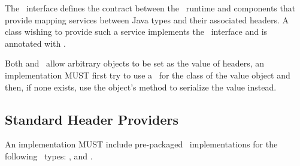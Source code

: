 The \HeaderProvider\ interface defines the contract between the \jaxrs\ runtime and components that provide mapping services between Java types and their associated headers. A class wishing to provide such a service implements the \HeaderProvider\ interface and is annotated with \Provider.

Both  and \EntityProvider\ allow arbitrary objects to be set as the value of headers, an implementation MUST first try to use a \HeaderProvider\ for the class of the value object and then, if none exists, use the object's  method to serialize the value instead.

\subsection{Standard Header Providers}
\label{standard_header_providers}

An implementation MUST include pre-packaged \HeaderProvider\ implementations for the following \jaxrs\ types: ,  and .